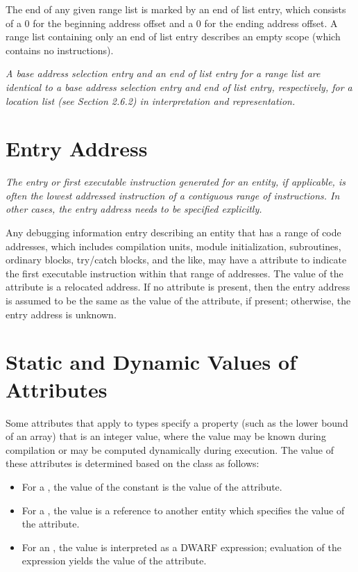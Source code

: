 The end of any given range list is marked by an end of
list entry, which consists of a 0 for the beginning address
offset and a 0 for the ending address offset. A range list
containing only an end of list entry describes an empty scope
(which contains no instructions).

\textit{A base address selection entry and an end of list entry for
a range list are identical to a base address selection entry
and end of list entry, respectively, for a location list
(see Section 2.6.2) in interpretation and representation.}



\section{Entry Address}
\label{chap:entryaddress}
\textit{The entry or first executable instruction generated
for an entity, if applicable, is often the lowest addressed
instruction of a contiguous range of instructions. In other
cases, the entry address needs to be specified explicitly.}

Any debugging information entry describing an entity that has
a range of code addresses, which includes compilation units,
module initialization, subroutines, ordinary blocks, try/catch
blocks, and the like, may have a  attribute to
indicate the first executable instruction within that range
of addresses. The value of the  attribute is a
relocated address. If no  attribute is present,
then the entry address is assumed to be the same as the
value of the  attribute, if present; otherwise,
the entry address is unknown.

\section{Static and Dynamic Values of Attributes}
\label{chap:staticanddynamicvaluesofattributes}

Some attributes that apply to types specify a property (such
as the lower bound of an array) that is an integer value,
where the value may be known during compilation or may be
computed dynamically during execution.  The value of these
attributes is determined based on the class as follows:

\begin{itemize}
\item For a , the value of the constant is the value of
the attribute.

\item For a , the
value is a reference to another
entity which specifies the value of the attribute.

\item For an , the value is interpreted as a 
DWARF expression; 
evaluation of the expression yields the value of
the attribute.
\end{itemize}

